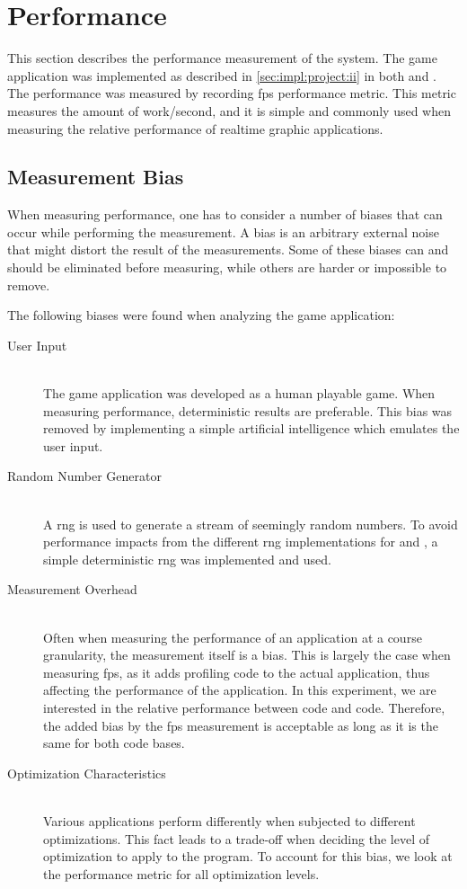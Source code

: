 
\section{Performance}
\label{sec:res:perf}

This section describes the performance measurement of the system.
The game application was implemented as described in \autoref{sec:impl:project:ii} in both {\C} and {\rust}.
The performance was measured by recording \gls{fps} performance metric.
This metric measures the amount of work/second, and it is simple and commonly used when measuring the relative performance of realtime graphic applications.

\subsection{Measurement Bias}
\label{sec:perf:bias}

When measuring performance, one has to consider a number of biases that can occur while performing the measurement.
A bias is an arbitrary external noise that might distort the result of the measurements.
Some of these biases can and should be eliminated before measuring, while others are harder or impossible to remove.

The following biases were found when analyzing the game application:
\begin{description}
  \item [User Input] \hfill \\
The game application was developed as a human playable game.
When measuring performance, deterministic results are preferable.
This bias was removed by implementing a simple artificial intelligence which emulates the user input.

  \item [Random Number Generator] \hfill \\
A \gls{rng} is used to generate a stream of seemingly random numbers.
To avoid performance impacts from the different \gls{rng} implementations for {\C} and {\rust,} a simple deterministic \gls{rng} was implemented and used.

  \item [Measurement Overhead] \hfill \\
Often when measuring the performance of an application at a course granularity, the measurement itself is a bias.
This is largely the case when measuring \gls{fps}, as it adds profiling code to the actual application, thus affecting the performance of the application.
In this experiment, we are interested in the relative performance between {\C} code and {\rust} code.
Therefore, the added bias by the \gls{fps} measurement is acceptable as long as it is the same for both code bases.

  \item [Optimization Characteristics] \hfill \\
Various applications perform differently when subjected to different optimizations.
This fact leads to a trade-off when deciding the level of optimization to apply to the program.
To account for this bias, we look at the performance metric for all optimization levels.
\end{description}

